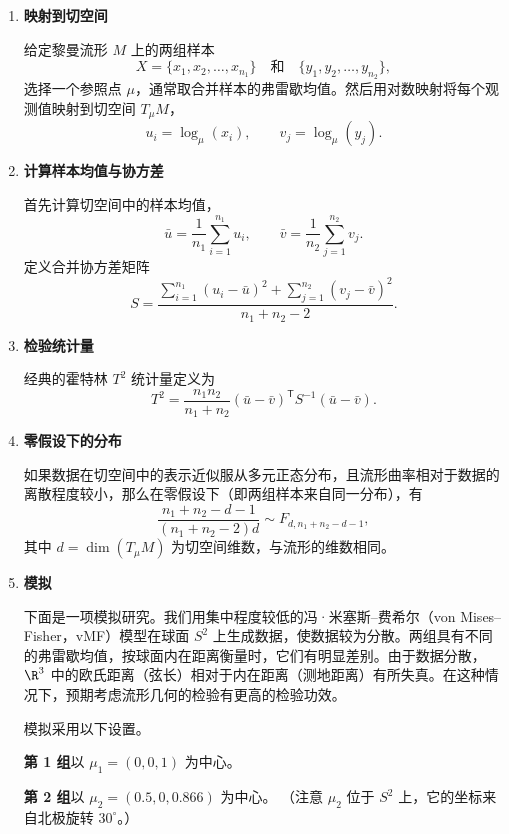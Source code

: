 \begin{enumerate}
  \item \textbf{映射到切空间}\par
  给定黎曼流形 $M$ 上的两组样本
  \[
    X=\{x_1,x_2,\ldots,x_{n_1}\}\quad\text{和}\quad
    \{y_1,y_2,\ldots,y_{n_2}\},
  \]
  选择一个参照点 $\mu$，通常取合并样本的弗雷歇均值。然后用对数映射将每个观测值映射到切空间 $T_\mu M$，
  \[
    u_i=\log_\mu(x_i),\qquad v_j=\log_\mu(y_j).
  \]

  \item \textbf{计算样本均值与协方差}\par
  首先计算切空间中的样本均值，
  \[
    \bar u=\frac{1}{n_1}\sum_{i=1}^{n_1}u_i,\qquad
    \bar v=\frac{1}{n_2}\sum_{j=1}^{n_2}v_j.
  \]
  定义合并协方差矩阵
  \[
    S=\frac{\sum_{i=1}^{n_1}(u_i-\bar u)^2+
              \sum_{j=1}^{n_2}(v_j-\bar v)^2}{n_1+n_2-2}.
  \]

  \item \textbf{检验统计量}\par
  经典的霍特林 $T^2$ 统计量定义为
  \[
    T^2=\frac{n_1n_2}{n_1+n_2}(\bar u-\bar v)^{\mathsf T}S^{-1}(\bar u-\bar v).
  \]

  \item \textbf{零假设下的分布}\par
  如果数据在切空间中的表示近似服从多元正态分布，且流形曲率相对于数据的离散程度较小，那么在零假设下（即两组样本来自同一分布），有
  \[
    \frac{n_1+n_2-d-1}{(n_1+n_2-2)d}\sim F_{d,n_1+n_2-d-1},
  \]
  其中 $d=\dim(T_\mu M)$ 为切空间维数，与流形的维数相同。

  \item \textbf{模拟}\par
  下面是一项模拟研究。我们用集中程度较低的冯·米塞斯–费希尔（von Mises–Fisher，vMF）模型在球面 $S^2$ 上生成数据，使数据较为分散。两组具有不同的弗雷歇均值，按球面内在距离衡量时，它们有明显差别。由于数据分散，$\R^3$ 中的欧氏距离（弦长）相对于内在距离（测地距离）有所失真。在这种情况下，预期考虑流形几何的检验有更高的检验功效。

  模拟采用以下设置。\par
  \textbf{第 1 组}以 $\mu_1=(0,0,1)$ 为中心。\par
  \textbf{第 2 组}以 $\mu_2=(0.5,0,0.866)$ 为中心。
  （注意 $\mu_2$ 位于 $S^2$ 上，它的坐标来自北极旋转 $30^\circ$。）


\end{enumerate}
